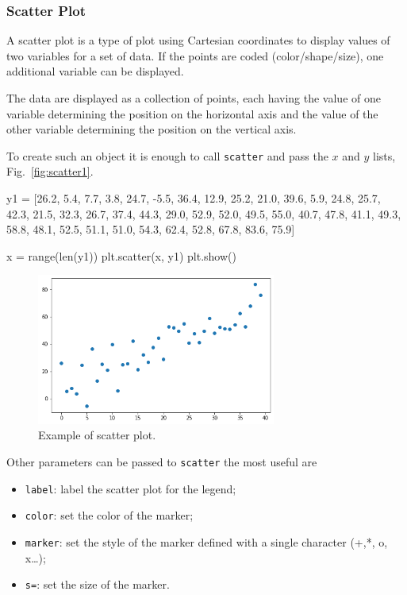\begin{ipython}
\subsubsection{Scatter Plot}\label{scatter}

A scatter plot is a type of plot using Cartesian coordinates to display values of two variables for a set of data. If the points are coded (color/shape/size), one additional variable can be displayed.

The data are displayed as a collection of points, each having the value of one variable determining the position on the horizontal axis and the value of the other variable determining the position on the vertical axis.

To create such an object it is enough to call \texttt{scatter} and pass the \(x\) and \(y\) lists, Fig.~\ref{fig:scatter1}.

\begin{ipython}
y1 = [26.2, 5.4, 7.7, 3.8, 24.7, -5.5, 36.4, 12.9, 25.2, 21.0, 39.6,
      5.9, 24.8, 25.7, 42.3, 21.5, 32.3, 26.7, 37.4, 44.3, 29.0,
      52.9, 52.0, 49.5, 55.0, 40.7, 47.8, 41.1, 49.3, 58.8, 48.1,
      52.5, 51.1, 51.0, 54.3, 62.4, 52.8, 67.8, 83.6, 75.9]

x = range(len(y1))
plt.scatter(x, y1)
plt.show()
\end{ipython}

\begin{figure}[htb]
	\centering
	\includegraphics[width=0.7\textwidth]{figures/scatter}
	\caption{Example of scatter plot.}
	\label{fig:scatter}
\end{figure}

Other parameters can be passed to \texttt{scatter} the most useful are

\begin{itemize}
	\tightlist
	\item
	\texttt{label}: label the scatter plot for the legend;
	\item
	\texttt{color}: set the color of the marker;
	\item
	\texttt{marker}: set the style of the marker defined with a single
	character (+,*, o, x\ldots{});
	\item
	\texttt{s=}: set the size of the marker.
\end{itemize}


\end{ipython}

